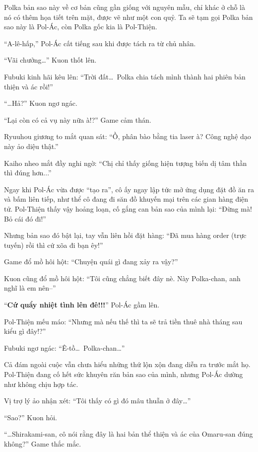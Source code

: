 \documentclass[../main.tex]{subfiles}
\begin{document}

Polka bản sao này về cơ bản cũng gần giống với nguyên mẫu, chỉ khác ở chỗ là nó có thêm họa tiết trên mặt, được vẽ như một con quỷ. Ta sẽ tạm gọi Polka bản sao này là Pol-Ác, còn Polka gốc kia là Pol-Thiện.

``A-lê-hấp,'' Pol-Ác cất tiếng sau khi được tách ra từ chủ nhân.

``Vãi chưởng\dots'' Kuon thốt lên.

Fubuki kinh hãi kêu lên: ``Trời đất\dots\ Polka chia tách mình thành hai phiên bản thiện và ác rồi!''

``\dots Hả?'' Kuon ngơ ngác.

``Lại còn có cả vụ này nữa à!?'' Game cảm thán.

Ryuuhou giương to mắt quan sát: ``Ồ, phân bào bằng tia laser à? Công nghệ dạo này ảo diệu thật.''

Kaiho nheo mắt đầy nghi ngờ: ``Chị chỉ thấy giống hiện tượng biến dị tâm thần thì đúng hơn...''

Ngay khi Pol-Ác vừa được ``tạo ra'', cô ấy ngay lập tức mở ứng dụng đặt đồ ăn ra và bấm liên tiếp, như thể cô đang đi săn đồ khuyến mại trên các gian hàng điện tử. Pol-Thiện thấy vậy hoảng loạn, cố gắng can bản sao của mình lại: ``Đừng mà! Bỏ cái đó đi!''


Nhưng bản sao đó bật lại, tay vẫn liên hồi đặt hàng: ``Đã mua hàng order (trực tuyến) rồi thì cứ xõa đi bạn êy!''

Game đổ mồ hôi hột: ``Chuyện quái gì đang xảy ra vậy?''

Kuon cũng đổ mồ hôi hột: ``Tôi cũng chẳng biết đây nè. Này Polka-chan, anh nghĩ là em nên--''

``\textbf{Cứ quẩy nhiệt tình lên đê!!!}'' Pol-Ác gầm lên.

Pol-Thiện mếu máo: ``Nhưng mà nếu thế thì ta sẽ trả tiền thuê nhà tháng sau kiểu gì đây!?''

Fubuki ngơ ngác: ``Ê-tồ\dots\ Polka-chan\dots''

Cả đám ngoài cuộc vẫn chưa hiểu những thứ lộn xộn đang diễn ra trước mắt họ. Pol-Thiện đang cố hết sức khuyên răn bản sao của mình, nhưng Pol-Ác dường như không chịu hợp tác.

Vị trợ lý ảo nhận xét: ``Tôi thấy có gì đó mâu thuẫn ở đây\dots''

``Sao?'' Kuon hỏi.

``\dots Shirakami-san, cô nói rằng đây là hai bản thể thiện và ác của Omaru-san đúng không?'' Game thắc mắc.
\end{document}
